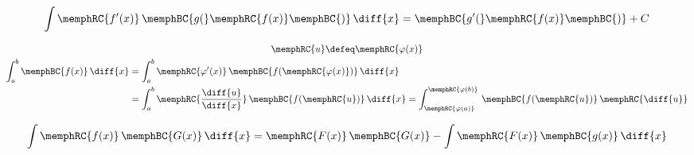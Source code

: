 \begin{multicols}{2}
\begin{CheatsheetEntryFrame}

    \end{CheatsheetEntryFrame}

    \MulticolsBreak

    \begin{CheatsheetEntryFrame}

        \begin{equation*}
            \int{\memphRC{f'(x)} \, \memphBC{g(}\memphRC{f(x)}\memphBC{)} \,\diff{x}}
                = \memphBC{g'(}\memphRC{f(x)}\memphBC{)} + C
        \end{equation*}

        \begin{gather*}
            \memphRC{u} \defeq \memphRC{\varphi(x)}
            \\
            \begin{aligned}
                \int_a^b{\memphBC{f(x)} \,\diff{x}}
                &= \int_a^b{
                    \memphRC{\varphi'(x)}
                    \, \memphBC{f(\memphRC{\varphi(x)})}
                    \, \diff{x}
                }
                \\
                &= \int_a^b{
                    \memphRC{\frac{\diff{u}}{\diff{x}}}
                    \, \memphBC{f(\memphRC{u})}
                    \, \diff{x}
                }
                = \int_{\memphRC{\varphi(a)}}^{\memphRC{\varphi(b)}}{
                    \, \memphBC{f(\memphRC{u})}
                    \, \memphRC{\diff{u}}
                }
            \end{aligned}
        \end{gather*}

        \begin{equation*}
            \int{\memphRC{f(x)} \, \memphBC{G(x)} \,\diff{x}}
            = \memphRC{F(x)} \, \memphBC{G(x)} - \int{\memphRC{F(x)} \, \memphBC{g(x)} \,\diff{x}}
        \end{equation*}

    \end{CheatsheetEntryFrame}

    \begin{CheatsheetEntryFrame}


\end{CheatsheetEntryFrame}
\end{multicols}
